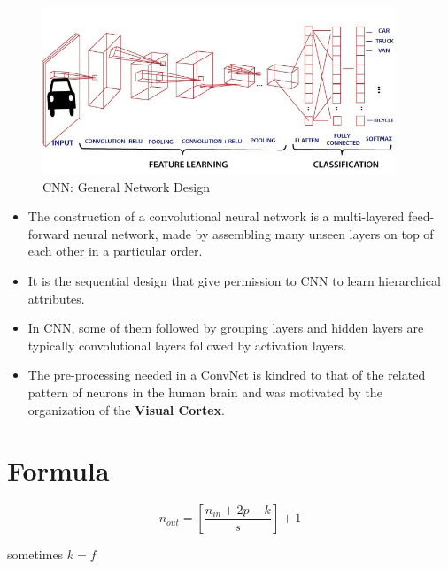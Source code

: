 \begin{figure}[h]
    \centering
    \includegraphics[width=\linewidth, height=5cm, keepaspectratio]{Pictures/convolutional-neural-network/convolutional-neural-network.jpg}
    \caption{CNN: General Network Design}
\end{figure}

\begin{itemize}
    \item The construction of a convolutional neural network is a multi-layered feed-forward neural network, made by assembling many unseen layers on top of each other in a particular order.

    \item It is the sequential design that give permission to CNN to learn hierarchical attributes.
    
    \item In CNN, some of them followed by grouping layers and hidden layers are typically convolutional layers followed by activation layers.
    
    \item The pre-processing needed in a ConvNet is kindred to that of the related pattern of neurons in the human brain and was motivated by the organization of the \textbf{Visual Cortex}.
\end{itemize}


\section{Formula}
\[
   \displaystyle n_{out} = \left[ \dfrac{n_{in} + 2p - k}{s} \right] + 1
\]

sometimes $k=f$

